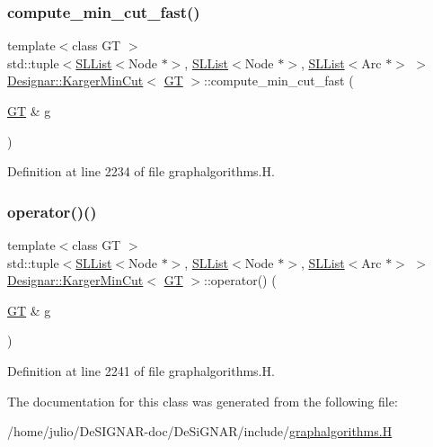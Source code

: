 \subsubsection{\texorpdfstring{compute\+\_\+min\+\_\+cut\+\_\+fast()}{compute\_min\_cut\_fast()}}
{\footnotesize\ttfamily template$<$class GT $>$ \\
std\+::tuple$<$\hyperlink{class_designar_1_1_s_l_list}{S\+L\+List}$<$Node $\ast$$>$, \hyperlink{class_designar_1_1_s_l_list}{S\+L\+List}$<$Node $\ast$$>$, \hyperlink{class_designar_1_1_s_l_list}{S\+L\+List}$<$Arc $\ast$$>$ $>$ \hyperlink{class_designar_1_1_karger_min_cut}{Designar\+::\+Karger\+Min\+Cut}$<$ \hyperlink{demo-buildgraph_8_c_a3001c40d2c31ca87ed96cd7d1334a55e}{GT} $>$\+::compute\+\_\+min\+\_\+cut\+\_\+fast (\begin{DoxyParamCaption}\item[{\hyperlink{demo-buildgraph_8_c_a3001c40d2c31ca87ed96cd7d1334a55e}{GT} \&}]{g }\end{DoxyParamCaption})\hspace{0.3cm}{\ttfamily [inline]}}



Definition at line 2234 of file graphalgorithms.\+H.

\mbox{\label{class_designar_1_1_karger_min_cut_a733802123d2510126abd4238688432ca}} 
\subsubsection{\texorpdfstring{operator()()}{operator()()}}
{\footnotesize\ttfamily template$<$class GT $>$ \\
std\+::tuple$<$\hyperlink{class_designar_1_1_s_l_list}{S\+L\+List}$<$Node $\ast$$>$, \hyperlink{class_designar_1_1_s_l_list}{S\+L\+List}$<$Node $\ast$$>$, \hyperlink{class_designar_1_1_s_l_list}{S\+L\+List}$<$Arc $\ast$$>$ $>$ \hyperlink{class_designar_1_1_karger_min_cut}{Designar\+::\+Karger\+Min\+Cut}$<$ \hyperlink{demo-buildgraph_8_c_a3001c40d2c31ca87ed96cd7d1334a55e}{GT} $>$\+::operator() (\begin{DoxyParamCaption}\item[{\hyperlink{demo-buildgraph_8_c_a3001c40d2c31ca87ed96cd7d1334a55e}{GT} \&}]{g }\end{DoxyParamCaption})\hspace{0.3cm}{\ttfamily [inline]}}



Definition at line 2241 of file graphalgorithms.\+H.



The documentation for this class was generated from the following file\+:\begin{DoxyCompactItemize}
\item 
/home/julio/\+De\+S\+I\+G\+N\+A\+R-\/doc/\+De\+Si\+G\+N\+A\+R/include/\hyperlink{graphalgorithms_8_h}{graphalgorithms.\+H}\end{DoxyCompactItemize}
